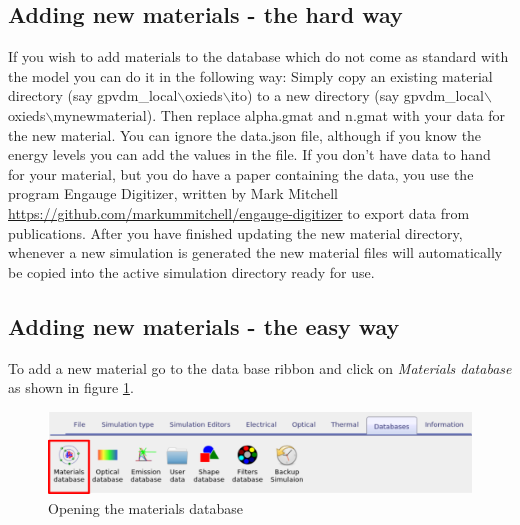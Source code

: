\subsection{Adding new materials - the hard way}
If you wish to add materials to the database which do not come as standard with the model you can do it in the following way:  Simply copy an existing material directory (say gpvdm\_local$\backslash$oxieds$\backslash$ito) to a new directory (say gpvdm\_local$\backslash$oxieds$\backslash$mynewmaterial).  Then replace alpha.gmat and n.gmat with your data for the new material. You can ignore the data.json file, although if you know the energy levels you can add the values in the file.
\newline
\newline
If you don't have data to hand for your material, but you do have a paper containing the data, you use the program Engauge Digitizer, written by  Mark Mitchell \url{https://github.com/markummitchell/engauge-digitizer} to export data from publications.  After you have finished updating the new material directory, whenever a new simulation is generated the new material files will automatically be copied into the active simulation directory ready for use. 

\subsection{Adding new materials - the easy way}

To add a new material go to the data base ribbon and click on \emph{Materials database} as shown in figure \ref{fig:materialadd1}.
\begin{figure}[H]
\centering
\includegraphics[height=0.18\textwidth]{./images/database_materials.png}
\caption{Opening the materials database}
\label{fig:materialadd1}
\end{figure}

